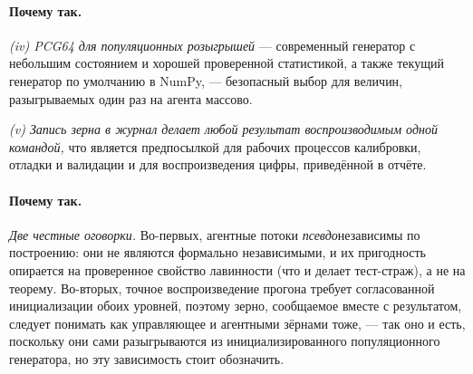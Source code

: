 \documentclass[12pt,a4paper]{article}
\newcommand{\why}[1]{\paragraph{Почему так.} #1}
\begin{document}
\why{\emph{(iv) PCG64 для популяционных розыгрышей} --- современный генератор с небольшим состоянием и
хорошей проверенной статистикой, а также текущий генератор по умолчанию в NumPy, --- безопасный выбор для
величин, разыгрываемых один раз на агента массово.

\emph{(v) Запись зерна в журнал делает любой результат воспроизводимым одной командой,} что является
предпосылкой для рабочих процессов калибровки, отладки и валидации и для воспроизведения цифры, приведённой
в отчёте.}

\why{\emph{Две честные оговорки.} Во-первых, агентные потоки \emph{псевдо}независимы по построению: они не
являются формально независимыми, и их пригодность опирается на проверенное свойство лавинности (что и делает
тест-страж), а не на теорему. Во-вторых, точное воспроизведение прогона требует согласованной инициализации
обоих уровней, поэтому зерно, сообщаемое вместе с результатом, следует понимать как управляющее и агентными
зёрнами тоже, --- так оно и есть, поскольку они сами разыгрываются из инициализированного популяционного
генератора, но эту зависимость стоит обозначить.}
\end{document}
